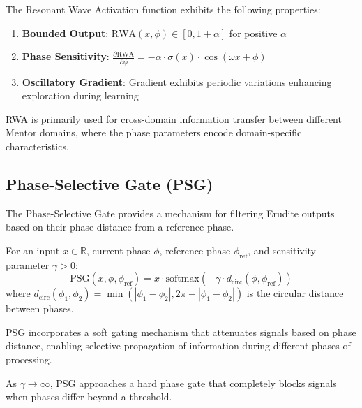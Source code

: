 \begin{proposition}
The Resonant Wave Activation function exhibits the following properties:
\begin{enumerate}
    \item \textbf{Bounded Output}: $\text{RWA}(x, \phi) \in [0, 1+\alpha]$ for positive $\alpha$
    \item \textbf{Phase Sensitivity}: $\frac{\partial\text{RWA}}{\partial\phi} = -\alpha \cdot \sigma(x) \cdot \cos(\omega x + \phi)$
    \item \textbf{Oscillatory Gradient}: Gradient exhibits periodic variations enhancing exploration during learning
\end{enumerate}
\end{proposition}

RWA is primarily used for cross-domain information transfer between different Mentor domains, where the phase parameters encode domain-specific characteristics.

\subsection{Phase-Selective Gate (PSG)}

The Phase-Selective Gate provides a mechanism for filtering Erudite outputs based on their phase distance from a reference phase.

\begin{definition}
For an input $x \in \mathbb{R}$, current phase $\phi$, reference phase $\phi_{\text{ref}}$, and sensitivity parameter $\gamma > 0$:
\begin{equation}
\text{PSG}(x, \phi, \phi_{\text{ref}}) = x \cdot \text{softmax}(-\gamma \cdot d_{\text{circ}}(\phi, \phi_{\text{ref}}))
\end{equation}
where $d_{\text{circ}}(\phi_1, \phi_2) = \min(|\phi_1 - \phi_2|, 2\pi - |\phi_1 - \phi_2|)$ is the circular distance between phases.
\end{definition}

PSG incorporates a soft gating mechanism that attenuates signals based on phase distance, enabling selective propagation of information during different phases of processing.

\begin{observation}
As $\gamma \to \infty$, PSG approaches a hard phase gate that completely blocks signals when phases differ beyond a threshold.
\end{observation}

